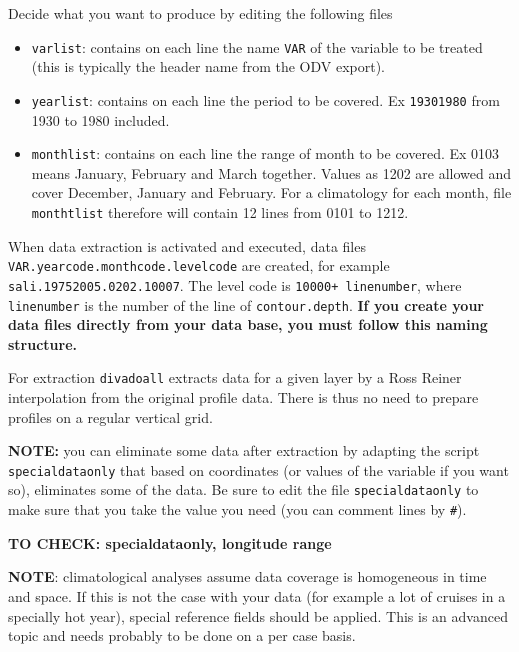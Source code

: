 \documentclass[8pt,a4paper,notitlepage]{book}
\begin{document}
Decide what you want to produce by editing the following files
\begin{itemize}
\item {\tt varlist}: contains on each line the name {\tt VAR} of the variable to be treated (this is typically the header name from the ODV export).
\item {\tt yearlist}: contains on each line the period to be covered. Ex {\tt 19301980} from 1930 to 1980 included. 
\item {\tt monthlist}: contains on each line the range of month to be covered. Ex 0103 means January,  February and March together. Values as 1202 are allowed and cover December, January and February. For a climatology for each month, file {\tt monthtlist} therefore will contain 12 lines from 0101 to 1212.
\end{itemize}


When data extraction is activated and executed, data files  {\tt VAR.yearcode.monthcode.levelcode} are created, for example {\tt sali.19752005.0202.10007}. The level code is {\tt 10000+ linenumber}, where {\tt linenumber} is the number of the line of {\tt contour.depth}.
{\bf If you create your data files directly from your data base, you must follow this naming structure.}


For extraction {\tt divadoall} extracts data for a given layer by a Ross Reiner interpolation from the original profile data. There is thus no need to prepare profiles on a regular vertical grid.



{\bf NOTE:} you can eliminate some data after extraction by adapting the script {\tt specialdataonly} that based on coordinates (or values of the variable if you want so), eliminates some of the data. Be sure to edit the file {\tt specialdataonly} to make sure that you take the value you need (you can comment lines by {\tt \#}). 

{\bf TO CHECK: specialdataonly, longitude range}



{\bf NOTE}: climatological analyses assume data coverage is homogeneous in time and space. If this is not the case with your data (for example a lot of cruises in a specially hot year), special reference fields should be applied. This is an advanced topic and needs probably to be done on a per case basis.


\end{document}
